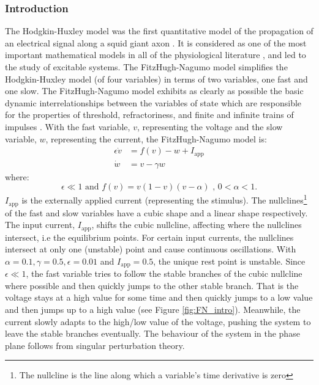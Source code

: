 \documentclass[a4paper, 12pt]{article}
\begin{document}
\subsubsection{Introduction}
The Hodgkin-Huxley model\cite{huxley} was the first quantitative model of the propagation of an electrical signal along a squid giant axon \cite{keener}. It is considered as one of the most important mathematical models in all of the physiological literature \cite{keener}, and led to the study of excitable systems.  The FitzHugh-Nagumo model simplifies the Hodgkin-Huxley model (of four variables) in terms of two variables, one fast and one slow. The FitzHugh-Nagumo model exhibits as clearly as possible the basic dynamic interrelationships between the variables of state which are responsible for the properties of threshold, refractoriness, and finite and infinite trains of impulses \cite{fitzhugh}.  With the fast variable, $v$, representing the voltage and the slow variable, $w$, representing the current, the FitzHugh-Nagumo model is:
\begin{align}
\epsilon\dot{v} &= f(v) - w + I_\text{app}\\
\dot{w} &= v - \gamma w
\end{align}
where: 
\begin{equation*}
\epsilon \ll 1 \text{  and  } f(v) = v(1-v)(v-\alpha) \text{ , } 0 <\alpha<1 .
\end{equation*} 
$I_\text{app}$ is the externally applied current (representing the stimulus). The nullclines\footnote{The nullcline is the line along which a variable's time derivative is zero} of the fast and slow variables have a cubic shape and a linear shape respectively.   The input current, $I_\text{app}$, shifts the cubic nullcline, affecting where the nullclines intersect, i.e the equilibrium points. For certain input currents, the nullclines intersect at only one (unstable) point and cause continuous oscillations. With $\alpha =0.1, \gamma = 0.5, \epsilon = 0.01$ and $I_{\text{app}}=0.5$, the unique rest point is unstable. Since $\epsilon \ll 1 $, the fast variable tries to follow the stable branches of the cubic nullcline where possible and then quickly jumps to the other stable branch. That is the voltage stays at a high value for some time and then quickly jumps to a low value and then jumps up to a high value (see Figure \ref{fig:FN_intro}).  Meanwhile, the current slowly adapts to the high/low value of the voltage, pushing the system to leave the stable branches eventually. The behaviour of the system in the phase plane follows from singular perturbation theory\cite{keener}. 
\end{document}
